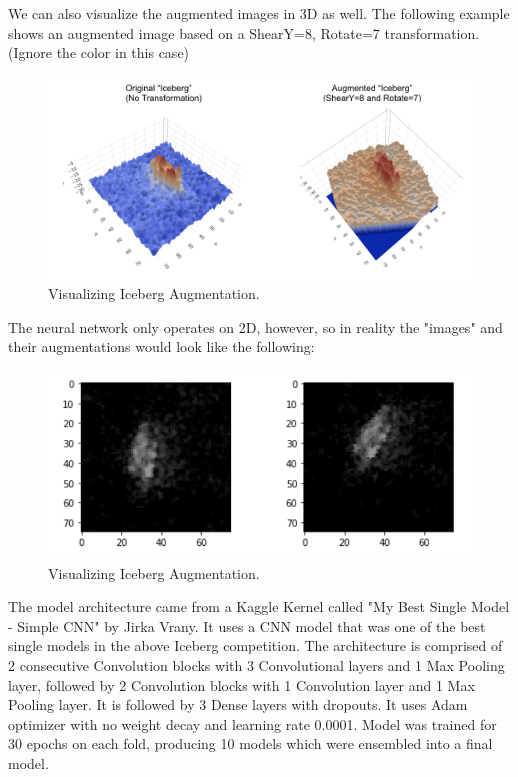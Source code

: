 \documentclass[10pt,twocolumn,letterpaper]{article}
\begin{document}
We can also visualize the augmented images in 3D as well.  The following example shows an augmented image based on a ShearY=8, Rotate=7 transformation.  (Ignore the color in this case) 

\begin{figure}[bhp]
\includegraphics[width=\columnwidth]{iceberg_aug_example.png}
\caption{Visualizing Iceberg Augmentation.}
\end{figure}

The neural network only operates on 2D, however, so in reality the "images" and their augmentations would look like the following:

\begin{figure}[bhp]
\includegraphics[width=\columnwidth]{iceberg_aug_2d_example.png}
\caption{Visualizing Iceberg Augmentation.}
\end{figure}

The model architecture came from a Kaggle Kernel called "My Best Single Model - Simple CNN" by Jirka Vrany.  It uses a CNN model that was one of the best single models in the above Iceberg competition. The architecture is comprised of 2 consecutive Convolution blocks with 3 Convolutional layers and 1 Max Pooling layer, followed by 2 Convolution blocks with 1 Convolution layer and 1 Max Pooling layer. It is followed by 3 Dense layers with dropouts. It uses Adam optimizer with no weight decay and learning rate 0.0001. Model was trained for 30 epochs on each fold, producing 10 models which were ensembled into a final model.  
\end{document}
